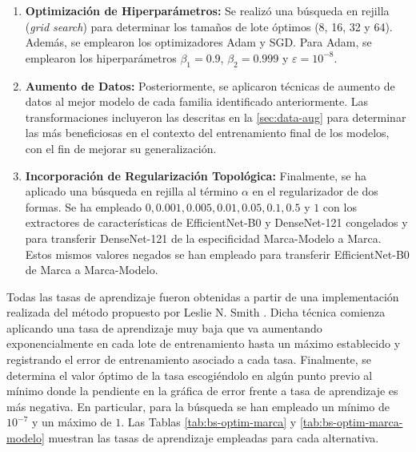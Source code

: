 \begin{enumerate}
	\item \textbf{Optimización de Hiperparámetros:}
	Se realizó una búsqueda en rejilla (\textit{grid search}) para determinar los tamaños de lote óptimos (8, 16, 32 y 64). Además, se emplearon los optimizadores Adam y SGD. Para Adam, se emplearon los hiperparámetros $\beta_1 = 0.9$, $\beta_2 = 0.999$ y $\varepsilon = 10^{-8}$.
	
	\item \textbf{Aumento de Datos:}
	Posteriormente, se aplicaron técnicas de aumento de datos al mejor modelo de cada familia identificado anteriormente. Las transformaciones incluyeron las descritas en la \autoref{sec:data-aug} para determinar las más beneficiosas en el contexto del entrenamiento final de los modelos, con el fin de mejorar su generalización.
	
	\item \textbf{Incorporación de Regularización Topológica:} Finalmente, se ha aplicado una búsqueda en rejilla al término $\alpha$ en el regularizador de dos formas. Se ha empleado $0, 0.001, 0.005, 0.01, 0.05, 0.1, 0.5$ y $1$ con los extractores de características de EfficientNet-B0 y DenseNet-121 congelados y para transferir DenseNet-121 de la especificidad Marca-Modelo a Marca. Estos mismos valores negados se han empleado para transferir EfficientNet-B0 de Marca a Marca-Modelo.
\end{enumerate}

Todas las tasas de aprendizaje fueron obtenidas a partir de una implementación realizada del método propuesto por Leslie N. Smith \cite{smith2017cyclicallearningratestraining}. Dicha técnica comienza aplicando una tasa de aprendizaje muy baja que va aumentando exponencialmente en cada lote de entrenamiento hasta un máximo establecido y registrando el error de entrenamiento asociado a cada tasa. Finalmente, se determina el valor óptimo de la tasa escogiéndolo en algún punto previo al mínimo donde la pendiente en la gráfica de error frente a tasa de aprendizaje es más negativa. En particular, para la búsqueda se han empleado un mínimo de $10^{-7}$ y un máximo de $1$. Las Tablas \ref{tab:bs-optim-marca} y \ref{tab:bs-optim-marca-modelo} muestran las tasas de aprendizaje empleadas para cada alternativa.

